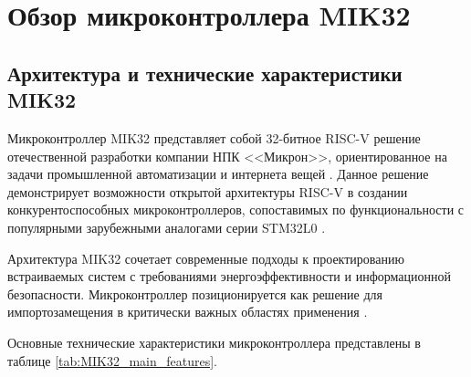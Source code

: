 \chapter{Обзор микроконтроллера MIK32}
\label{cha:mik32}

\section{Архитектура и технические характеристики MIK32}

Микроконтроллер MIK32 представляет собой 32-битное RISC-V решение отечественной разработки компании НПК <<Микрон>>, ориентированное на задачи промышленной автоматизации и интернета вещей \cite{mik32_technical_spec, cnxsoft2021mik32}. Данное решение демонстрирует возможности открытой архитектуры RISC-V в создании конкурентоспособных микроконтроллеров, сопоставимых по функциональности с популярными зарубежными аналогами серии STM32L0 \cite{electronicslab2021mik32}.

Архитектура MIK32 сочетает современные подходы к проектированию встраиваемых систем с требованиями энергоэффективности и информационной безопасности. Микроконтроллер позиционируется как решение для импортозамещения в критически важных областях применения \cite{mik32_technical_spec}.

Основные технические характеристики микроконтроллера представлены в таблице \ref{tab:MIK32_main_features}.

